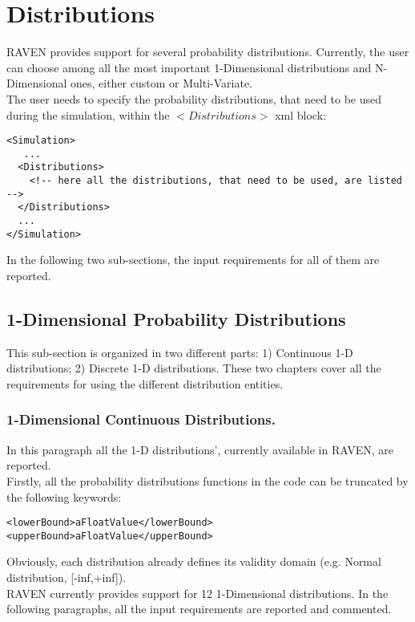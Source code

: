\section{Distributions \\ \vspace{2 mm}}
\label{sec:distributions}
\newcommand{\distname}[1]{\textbf{#1}}
\newcommand{\distattrib}[1]{\textit{#1}}
RAVEN provides support for several probability distributions. Currently, the user can choose among all the most important 1-Dimensional distributions and N-Dimensional ones, either custom or Multi-Variate.  
\\ The user needs to specify the probability distributions, that need to be used during the simulation, within the $<Distributions>$ xml block:
\begin{lstlisting}[style=XML]
<Simulation>
   ...
  <Distributions>
    <!-- here all the distributions, that need to be used, are listed -->
  </Distributions>
  ...
</Simulation>
\end{lstlisting}
In the following two sub-sections, the input requirements for all of them are reported.
\subsection{1-Dimensional Probability Distributions}
\label{subsec:1dDist}

This sub-section is organized in two different parts: 1) Continuous 1-D distributions; 2) Discrete 1-D distributions. These two chapters cover all the  requirements for using the different distribution entities. 
\subsubsection{1-Dimensional Continuous Distributions.}
\label{subsubsec:1DContinuous}

In this paragraph all the 1-D distributions', currently available in RAVEN, are reported.
\\ Firstly, all the probability distributions functions in the code can be truncated by the following keywords:
\begin{lstlisting}[style=XML]
<lowerBound>aFloatValue</lowerBound>
<upperBound>aFloatValue</upperBound>
\end{lstlisting}
Obviously, each distribution already defines its validity domain (e.g. Normal distribution, [-inf,+inf]).
\\ RAVEN currently provides support for 12 1-Dimensional distributions.  In the following paragraphs, all the input requirements are reported and commented.

